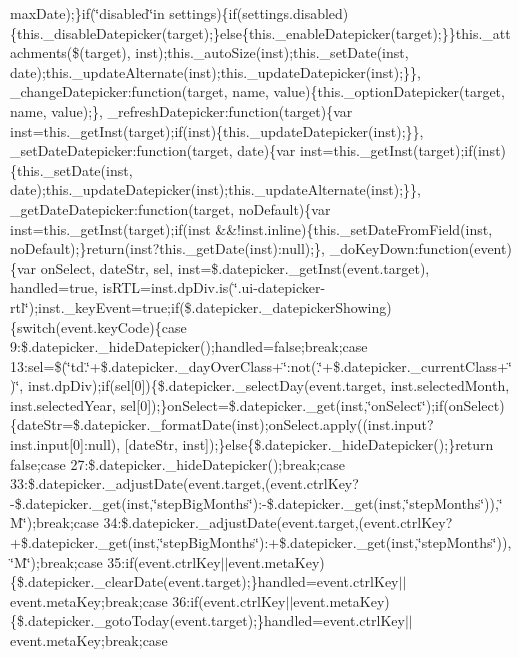 {{\begin{DoxyParamCaption}
max\+Date);\}if(\char`\"{}disabled\char`\"{}in settings)\{if(settings.\+disabled)\{this.\+\_\+disable\+Datepicker(target);\}else\{this.\+\_\+enable\+Datepicker(target);\}\}this.\+\_\+attachments(\$(target), inst);this.\+\_\+auto\+Size(inst);this.\+\_\+set\+Date(inst, date);this.\+\_\+update\+Alternate(inst);this.\+\_\+update\+Datepicker(inst);\}\}, \+\_\+change\+Datepicker\+:function(target, name, value)\{this.\+\_\+option\+Datepicker(target, name, value);\}, \+\_\+refresh\+Datepicker\+:function(target)\{var inst=this.\+\_\+get\+Inst(target);if(inst)\{this.\+\_\+update\+Datepicker(inst);\}\}, \+\_\+set\+Date\+Datepicker\+:function(target, date)\{var inst=this.\+\_\+get\+Inst(target);if(inst)\{this.\+\_\+set\+Date(inst, date);this.\+\_\+update\+Datepicker(inst);this.\+\_\+update\+Alternate(inst);\}\}, \+\_\+get\+Date\+Datepicker\+:function(target, no\+Default)\{var inst=this.\+\_\+get\+Inst(target);if(inst \&\&!inst.\+inline)\{this.\+\_\+set\+Date\+From\+Field(inst, no\+Default);\}return(inst?this.\+\_\+get\+Date(inst)\+:null);\}, \+\_\+do\+Key\+Down\+:function(event)\{var on\+Select, date\+Str, sel, inst=\$.\+datepicker.\+\_\+get\+Inst(event.\+target), handled=true, is\+R\+T\+L=inst.\+dp\+Div.\+is(\char`\"{}.\+ui-\/datepicker-\/rtl\char`\"{});inst.\+\_\+key\+Event=true;if(\$.\+datepicker.\+\_\+datepicker\+Showing)\{switch(event.\+key\+Code)\{case 9\+:\$.\+datepicker.\+\_\+hide\+Datepicker();handled=false;break;case 13\+:sel=\$(\char`\"{}td.\char`\"{}+\$.\+datepicker.\+\_\+day\+Over\+Class+\char`\"{}\+:not(.\char`\"{}+\$.\+datepicker.\+\_\+current\+Class+\char`\"{})\char`\"{}, inst.\+dp\+Div);if(sel\mbox{[}0\mbox{]})\{\$.\+datepicker.\+\_\+select\+Day(event.\+target, inst.\+selected\+Month, inst.\+selected\+Year, sel\mbox{[}0\mbox{]});\}on\+Select=\$.\+datepicker.\+\_\+get(inst,\char`\"{}on\+Select\char`\"{});if(on\+Select)\{date\+Str=\$.\+datepicker.\+\_\+format\+Date(inst);on\+Select.\+apply((inst.\+input?inst.\+input\mbox{[}0\mbox{]}\+:null), \mbox{[}date\+Str, inst\mbox{]});\}else\{\$.\+datepicker.\+\_\+hide\+Datepicker();\}return false;case 27\+:\$.\+datepicker.\+\_\+hide\+Datepicker();break;case 33\+:\$.\+datepicker.\+\_\+adjust\+Date(event.\+target,(event.\+ctrl\+Key?-\/\$.\+datepicker.\+\_\+get(inst,\char`\"{}step\+Big\+Months\char`\"{})\+:-\/\$.\+datepicker.\+\_\+get(inst,\char`\"{}step\+Months\char`\"{})),\char`\"{}\+M\char`\"{});break;case 34\+:\$.\+datepicker.\+\_\+adjust\+Date(event.\+target,(event.\+ctrl\+Key?+\$.\+datepicker.\+\_\+get(inst,\char`\"{}step\+Big\+Months\char`\"{})\+:+\$.\+datepicker.\+\_\+get(inst,\char`\"{}step\+Months\char`\"{})),\char`\"{}\+M\char`\"{});break;case 35\+:if(event.\+ctrl\+Key$\vert$$\vert$event.\+meta\+Key)\{\$.\+datepicker.\+\_\+clear\+Date(event.\+target);\}handled=event.\+ctrl\+Key$\vert$$\vert$event.\+meta\+Key;break;case 36\+:if(event.\+ctrl\+Key$\vert$$\vert$event.\+meta\+Key)\{\$.\+datepicker.\+\_\+goto\+Today(event.\+target);\}handled=event.\+ctrl\+Key$\vert$$\vert$event.\+meta\+Key;break;case 
\end{DoxyParamCaption}}}
